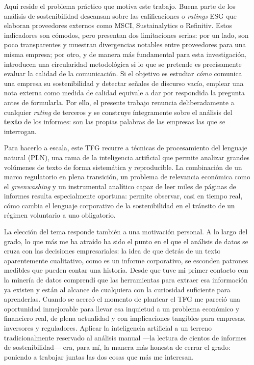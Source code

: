 Aquí reside el problema práctico que motiva este trabajo. Buena parte de los análisis de
sostenibilidad descansan sobre las calificaciones o \textit{ratings} ESG que elaboran
proveedores externos como MSCI, Sustainalytics o Refinitiv. Estos indicadores son cómodos,
pero presentan dos limitaciones serias: por un lado, son poco transparentes y muestran
divergencias notables entre proveedores para una misma empresa; por otro, y de manera más
fundamental para esta investigación, introducen una circularidad metodológica si lo que se
pretende es precisamente evaluar la calidad de la comunicación. Si el objetivo es estudiar
\textit{cómo} comunica una empresa su sostenibilidad y detectar señales de discurso vacío,
emplear una nota externa como medida de calidad equivale a dar por respondida la pregunta
antes de formularla. Por ello, el presente trabajo renuncia deliberadamente a cualquier
\textit{rating} de terceros y se construye íntegramente sobre el análisis del \textbf{texto}
de los informes: son las propias palabras de las empresas las que se interrogan.

Para hacerlo a escala, este TFG recurre a técnicas de procesamiento del lenguaje natural
(PLN), una rama de la inteligencia artificial que permite analizar grandes volúmenes de
texto de forma sistemática y reproducible. La combinación de un marco regulatorio en plena
transición, un problema de relevancia económica como el \textit{greenwashing} y un
instrumental analítico capaz de leer miles de páginas de informes resulta especialmente
oportuna: permite observar, casi en tiempo real, cómo cambia el lenguaje corporativo de la
sostenibilidad en el tránsito de un régimen voluntario a uno obligatorio.

\bigskip
La elección del tema responde también a una motivación personal. A lo largo del grado, lo
que más me ha atraído ha sido el punto en el que el análisis de datos se cruza con las
decisiones empresariales: la idea de que detrás de un texto aparentemente cualitativo, como
es un informe corporativo, se esconden patrones medibles que pueden contar una historia.
Desde que tuve mi primer contacto con la minería de datos comprendí que las herramientas
para extraer esa información ya existen y están al alcance de cualquiera con la curiosidad
suficiente para aprenderlas. Cuando se acercó el momento de plantear el TFG me pareció una
oportunidad inmejorable para llevar esa inquietud a un problema económico y financiero real,
de plena actualidad y con implicaciones tangibles para empresas, inversores y reguladores.
Aplicar la inteligencia artificial a un terreno tradicionalmente reservado al análisis manual
—la lectura de cientos de informes de sostenibilidad— era, para mí, la manera más honesta de
cerrar el grado: poniendo a trabajar juntas las dos cosas que más me interesan.

